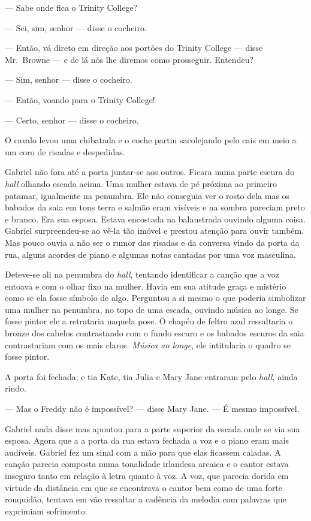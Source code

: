 --- Sabe onde fica o Trinity College?

--- Sei, sim, senhor --- disse o cocheiro.

--- Então, vá direto em direção aos portões do Trinity College --- disse 
Mr.~Browne --- e de lá nós lhe diremos como prosseguir.  Entendeu?

--- Sim, senhor --- disse o cocheiro.

--- Então, voando para o Trinity College!

--- Certo, senhor --- disse o cocheiro.

O cavalo levou uma chibatada e o coche partiu sacolejando pelo cais em meio a
um coro de risadas e despedidas.

Gabriel não fora até a porta juntar-se aos outros.  Ficara numa parte escura do
\textit{hall} olhando escada acima.  Uma mulher estava de pé próxima ao
primeiro patamar, igualmente na penumbra.  Ele não conseguia ver o rosto dela
mas os babados da saia em tons terra e salmão eram visíveis e na sombra
pareciam preto e branco.  Era sua esposa.  Estava encostada na balaustrada
ouvindo alguma coisa.  Gabriel surpreendeu-se ao vê-la tão imóvel e prestou
atenção para ouvir também.  Mas pouco ouvia a não ser o rumor das risadas e da
conversa vindo da porta da rua, alguns acordes de piano e algumas notas
cantadas por uma voz masculina.

Deteve-se ali na penumbra do \textit{hall}, tentando identificar a canção
que a voz entoava e com o olhar fixo na mulher.  Havia em sua atitude graça e
mistério como se ela fosse símbolo de algo.  Perguntou a si mesmo o que poderia
simbolizar uma mulher na penumbra, no topo de uma escada, ouvindo música ao
longe.  Se fosse pintor ele a retrataria naquela pose.  O chapéu de feltro azul
ressaltaria o bronze dos cabelos contrastando com o fundo escuro e os babados
escuros da saia contrastariam com os mais claros.  \textit{Música ao longe},
ele intitularia o quadro se fosse pintor.

A porta foi fechada; e tia Kate, tia Julia e Mary Jane entraram pelo
\textit{hall}, ainda rindo.

--- Mas o Freddy não é impossível? --- disse Mary Jane.  --- É mesmo
impossível.

Gabriel nada disse mas apontou para a parte superior da escada onde se via sua
esposa.  Agora que a a porta da rua estava fechada a voz e o piano eram mais
audíveis.  Gabriel fez um sinal com a mão para que elas ficassem caladas.  A
canção parecia composta numa tonalidade irlandesa arcaica e o cantor estava
inseguro tanto em relação à letra quanto à voz.  A voz, que parecia dorida em
virtude da distância em que se encontrava o cantor bem como de uma forte
rouquidão, tentava em vão ressaltar a cadência da melodia com palavras que
exprimiam sofrimento:


